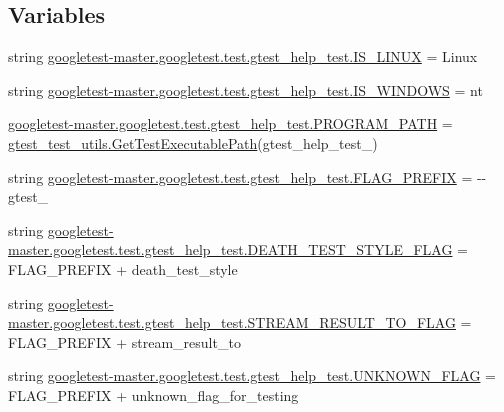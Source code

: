 \subsection*{Variables}
\begin{DoxyCompactItemize}
\item 
string \mbox{\hyperlink{namespacegoogletest-master_1_1googletest_1_1test_1_1gtest__help__test_a7bd6ac6a23ab3655efcc831651853871}{googletest-\/master.\+googletest.\+test.\+gtest\+\_\+help\+\_\+test.\+I\+S\+\_\+\+L\+I\+N\+UX}} = \textquotesingle{}Linux\textquotesingle{}
\item 
string \mbox{\hyperlink{namespacegoogletest-master_1_1googletest_1_1test_1_1gtest__help__test_af3876b8fb5ca29ccfb442e1165bd3727}{googletest-\/master.\+googletest.\+test.\+gtest\+\_\+help\+\_\+test.\+I\+S\+\_\+\+W\+I\+N\+D\+O\+WS}} = \textquotesingle{}nt\textquotesingle{}
\item 
\mbox{\hyperlink{namespacegoogletest-master_1_1googletest_1_1test_1_1gtest__help__test_add8a005508e33d868b28a8c7453cb8a1}{googletest-\/master.\+googletest.\+test.\+gtest\+\_\+help\+\_\+test.\+P\+R\+O\+G\+R\+A\+M\+\_\+\+P\+A\+TH}} = \mbox{\hyperlink{namespacegtest__test__utils_a89ed3717984a80ffbb7a9c92f71b86a2}{gtest\+\_\+test\+\_\+utils.\+Get\+Test\+Executable\+Path}}(\textquotesingle{}gtest\+\_\+help\+\_\+test\+\_\+\textquotesingle{})
\item 
string \mbox{\hyperlink{namespacegoogletest-master_1_1googletest_1_1test_1_1gtest__help__test_a611edeaab6f028e090dc444b288fa411}{googletest-\/master.\+googletest.\+test.\+gtest\+\_\+help\+\_\+test.\+F\+L\+A\+G\+\_\+\+P\+R\+E\+F\+IX}} = \textquotesingle{}-\/-\/gtest\+\_\+\textquotesingle{}
\item 
string \mbox{\hyperlink{namespacegoogletest-master_1_1googletest_1_1test_1_1gtest__help__test_aae60906470ac99a57eb801fcd1c89aed}{googletest-\/master.\+googletest.\+test.\+gtest\+\_\+help\+\_\+test.\+D\+E\+A\+T\+H\+\_\+\+T\+E\+S\+T\+\_\+\+S\+T\+Y\+L\+E\+\_\+\+F\+L\+AG}} = F\+L\+A\+G\+\_\+\+P\+R\+E\+F\+IX + \textquotesingle{}death\+\_\+test\+\_\+style\textquotesingle{}
\item 
string \mbox{\hyperlink{namespacegoogletest-master_1_1googletest_1_1test_1_1gtest__help__test_a86cb984cf3daffe2cd48f7c693121aa6}{googletest-\/master.\+googletest.\+test.\+gtest\+\_\+help\+\_\+test.\+S\+T\+R\+E\+A\+M\+\_\+\+R\+E\+S\+U\+L\+T\+\_\+\+T\+O\+\_\+\+F\+L\+AG}} = F\+L\+A\+G\+\_\+\+P\+R\+E\+F\+IX + \textquotesingle{}stream\+\_\+result\+\_\+to\textquotesingle{}
\item 
string \mbox{\hyperlink{namespacegoogletest-master_1_1googletest_1_1test_1_1gtest__help__test_a4ec0f16ca565eca3b1d53e7fc2fe7843}{googletest-\/master.\+googletest.\+test.\+gtest\+\_\+help\+\_\+test.\+U\+N\+K\+N\+O\+W\+N\+\_\+\+F\+L\+AG}} = F\+L\+A\+G\+\_\+\+P\+R\+E\+F\+IX + \textquotesingle{}unknown\+\_\+flag\+\_\+for\+\_\+testing\textquotesingle{}

\end{DoxyCompactItemize}
